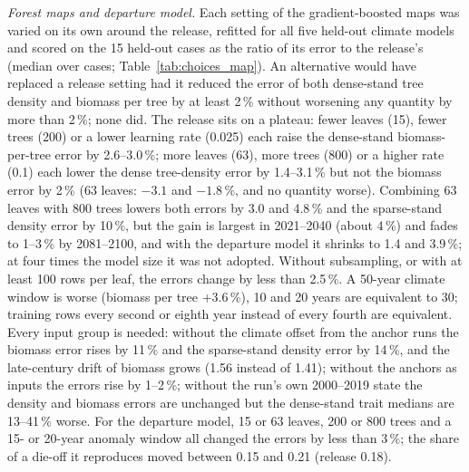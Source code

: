 \documentclass[11pt,a4paper]{article}
\begin{document}
\emph{Forest maps and departure model.} Each setting of the gradient-boosted maps was varied on its own around the
release, refitted for all five held-out climate models and scored on the 15 held-out cases as the ratio of its error
to the release's (median over cases; Table~\ref{tab:choices_map}). An alternative would have replaced a release
setting had it reduced the error of both dense-stand tree density and biomass per tree by at least 2\,\% without
worsening any quantity by more than 2\,\%; none did. The release sits on a plateau: fewer leaves (15), fewer trees
(200) or a lower learning rate (0.025) each raise the dense-stand biomass-per-tree error by 2.6--3.0\,\%; more leaves
(63), more trees (800) or a higher rate (0.1) each lower the dense tree-density error by 1.4--3.1\,\% but not the
biomass error by 2\,\% (63 leaves: $-3.1$ and $-1.8$\,\%, and no quantity worse). Combining 63 leaves with 800 trees
lowers both errors by 3.0 and 4.8\,\% and the sparse-stand density error by 10\,\%, but the gain is largest in
2021--2040 (about 4\,\%) and fades to 1--3\,\% by 2081--2100, and with the departure model it shrinks to 1.4 and
3.9\,\%; at four times the model size it was not adopted. Without subsampling, or with at
least 100 rows per leaf, the errors change by less than 2.5\,\%. A 50-year climate window is worse (biomass per tree
+3.6\,\%), 10 and 20 years are equivalent to 30; training rows every second or eighth year instead of every fourth
are equivalent. Every input group is needed: without the climate offset from the anchor runs the biomass error rises
by 11\,\% and the sparse-stand density error by 14\,\%, and the late-century drift of biomass grows (1.56 instead of
1.41); without the anchors as inputs the errors rise by 1--2\,\%; without the run's own 2000--2019 state the density
and biomass errors are unchanged but the dense-stand trait medians are 13--41\,\% worse. For the departure model,
15 or 63 leaves, 200 or 800 trees and a 15- or 20-year anomaly window all changed the errors by less than 3\,\%;
the share of a die-off it reproduces moved between 0.15 and 0.21 (release 0.18).
\end{document}
